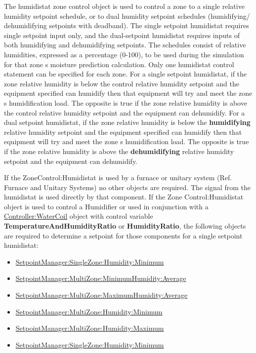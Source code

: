 The humidistat zone control object is used to control a zone to a single relative humidity setpoint schedule, or to dual humidity setpoint schedules (humidifying/ dehumidifying setpoints with deadband). The single setpoint humidistat requires single setpoint input only, and the dual-setpoint humidistat requires inputs of both humidifying and dehumidifying setpoints. The schedules consist of relative humidities, expressed as a percentage (0-100), to be used during the simulation for that zone s moisture prediction calculation. Only one humidistat control statement can be specified for each zone. For a single setpoint humidistat, if the zone relative humidity is below the control relative humidity setpoint and the equipment specified can humidify then that equipment will try and meet the zone s humidification load. The opposite is true if the zone relative humidity is above the control relative humidity setpoint and the equipment can dehumidify. For a dual setpoint humidistat, if the zone relative humidity is below the \textbf{humidifying} relative humidity setpoint and the equipment specified can humidify then that equipment will try and meet the zone s humidification load. The opposite is true if the zone relative humidity is above the \textbf{dehumidifying} relative humidity setpoint and the equipment can dehumidify.

If the ZoneControl:Humidistat is used by a furnace or unitary system (Ref. Furnace and Unitary Systems) no other objects are required. The signal from the humidistat is used directly by that component. If the Zone Control:Humidistat object is used to control a Humidifier or used in conjunction with a \hyperref[controllerwatercoil]{Controller:WaterCoil} object with control variable \textbf{TemperatureAndHumidityRatio} or \textbf{HumidityRatio}, the following objects are required to determine a setpoint for those components for a single setpoint humidistat:

\begin{itemize}
\item
  \hyperref[setpointmanagersinglezonehumidityminimum]{SetpointManager:SingleZone:Humidity:Minimum}
\item
  \hyperref[setpointmanagermultizoneminimumhumidityaverage]{SetpointManager:MultiZone:MinimumHumidity:Average}
\item
  \hyperref[setpointmanagermultizonemaximumhumidityaverage]{SetpointManager:MultiZone:MaximumHumidity:Average}
\item
  \hyperref[setpointmanagermultizonehumidityminimum]{SetpointManager:MultiZone:Humidity:Minimum}
\item
  \hyperref[setpointmanagermultizonehumiditymaximum]{SetpointManager:MultiZone:Humidity:Maximum}
\item
  \hyperref[setpointmanagersinglezonehumidityminimum]{SetpointManager:SingleZone:Humidity:Minimum}
\end{itemize}

